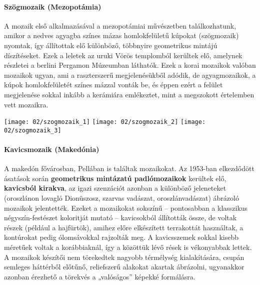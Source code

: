 \paragraph{Szögmozaik (Mezopotámia)}
A mozaik első alkalmazásával a mezopotámiai művészetben találkozhatunk, amikor a nedves agyagba színes mázas homlokfelületű kúpokat (szögmozaik) nyomtak, így állítottak elő különböző, többnyire geometrikus mintájú díszítéseket. Ezek a leletek az uruki Vörös templomból kerültek elő, amelynek részletei a berlini Pergamon Múzeumban láthatók. Ezek a korai mozaikok valóban mozaikok ugyan, ami a raszterszerű megjelenésükből adódik, de agyagmozaikok, a kúpok homlokfelületét színes mázzal vonták be, és éppen ezért a felület megjelenése sokkal inkább a kerámiára emlékeztet, mint a megszokott értelemben vett mozaikra.

\begin{tcolorbox}[enhanced,colframe=gray!50!white,
	colbacktitle=white!15!white,
	coltitle=gray!50!black,
	borderline={0.5mm}{0mm}{gray!15!white},
	borderline={0.5mm}{0mm}{gray!50!white,dashed},
	attach boxed title to top center={yshift=-2mm},
	boxed title style={boxrule=0.4pt},
	title=A szögmozaik technika]{
		\texttt{[image: 02/szogmozaik\_1]}
		\texttt{[image: 02/szogmozaik\_2]}
		\texttt{[image: 02/szogmozaik\_3]}
	}
\end{tcolorbox}

\paragraph{Kavicsmozaik (Makedónia)}
A makedón fővárosban, Pellában is találtak mozaikokat. Az 1953-ban elkezdődött ásatások során \textbf{geometrikus mintázatú padlómozaikok} kerültek elő, \textbf{kavicsból kirakva}, az igazi szenzációt azonban a különböző jeleneteket (oroszlánon lovagló Dionüszosz, szarvas vadászat, oroszlánvadászat) ábrázoló mozaikok jelentették. Ezeket a mozaikokat sokszínű – pontosabban a klasszikus négyszín-festészet koloritját mutató – kavicsokból állították össze, de voltak részek (például a hajfürtök), amihez előre elkészített terrakottát használtak, a kontúrokat pedig ólomsávokkal rajzolták meg. A kavicsszemek sokkal kisebb méretűek voltak a korábbiaknál, így a közöttük lévő rések is vékonyabbak lettek. A mozaikok készítői nem törekedtek nagyobb térmélység kialakítására, csupán semleges háttérből előtűnő, reliefszerű alakokat akartak ábrázolni, ugyanakkor azonban érezhető a törekvés a „valóságos” képekké formálásra.

